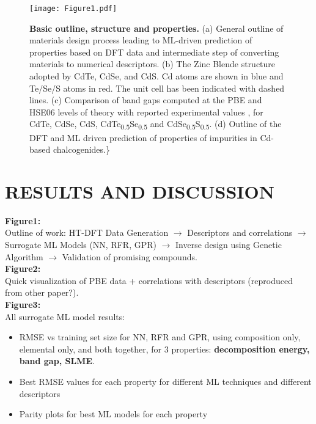 \documentclass[preprint]{revtex4-2}
\begin{document}
\begin{figure}[htbp]
\centering
\texttt{[image: Figure1.pdf]}
\caption{\label{fig:outline} \textbf{Basic outline, structure and properties.} (a) General outline of materials design process leading to ML-driven prediction of properties based on DFT data and intermediate step of converting materials to numerical descriptors. (b) The Zinc Blende structure adopted by CdTe, CdSe, and CdS. Cd atoms are shown in blue and Te/Se/S atoms in red. The unit cell has been indicated with dashed lines. (c) Comparison of band gaps computed at the PBE and HSE06 levels of theory with reported experimental values \cite{kim-2014-cdses-nanow,swanson-2017-co-sublim}, for CdTe, CdSe, CdS, CdTe\textsubscript{0.5}Se\textsubscript{0.5} and CdSe\textsubscript{0.5}S\textsubscript{0.5}. (d) Outline of the DFT and ML driven prediction of properties of impurities in Cd-based chalcogenides.\}}
\end{figure}

\section*{RESULTS AND DISCUSSION}
\label{sec:org6f0ef2f}
\textbf{Figure1:}\\
Outline of work: HT-DFT Data Generation \(\rightarrow\) Descriptors and
correlations \(\rightarrow\) Surrogate ML Models (NN, RFR, GPR)
\(\rightarrow\) Inverse design using Genetic Algorithm \(\rightarrow\)
Validation of promising compounds.\\
\textbf{Figure2:}\\
Quick visualization of PBE data + correlations with descriptors
(reproduced from other paper?).\\
\textbf{Figure3:}\\
All surrogate ML model results:

\begin{itemize}
\item RMSE vs training set size for NN, RFR and GPR, using composition only,
elemental only, and both together, for 3 properties: \textbf{decomposition
energy, band gap, SLME}.

\item Best RMSE values for each property for different ML techniques and
different descriptors

\item Parity plots for best ML models for each property
\end{itemize}
\end{document}
